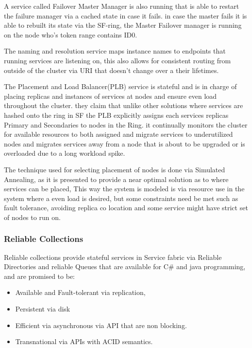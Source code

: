 \documentclass[a4paper,10pt,titlepage]{report}
\begin{document}
A service called Failover Master Manager is also running that is able to restart the failure manager via a cached state in case it fails. in case the master fails it is able to rebuilt its state via the SF-ring, the Master Failover manager is running on the node who's token range contains ID0.\\
\vspace{5mm}

The naming and resolution service maps instance names to endpoints that running services are listening on, this also allows for consistent routing from outside of the cluster via URI that doesn't change over a their lifetimes.\\
\vspace{5mm} 

The Placement and Load Balancer(PLB) service is stateful and is in charge of placing replicas and instances of services at nodes and ensure even load throughout the cluster. they claim that unlike other solutions where services are hashed onto the ring in SF the PLB explicitly assigns each services replicas Primary and Secondaries to nodes in the Ring. it continually monitors the cluster for available resources to both assigned and migrate services to underutilized nodes and migrates services away from a node that is about to be upgraded or is overloaded due to a long workload spike.\\
\vspace{5mm}

The technique used for selecting placement of nodes is done via Simulated Annealing, as it is presented to provide a near optimal solution as to where services can be placed, This way the system is modeled is via resource use in the system where a even load is desired, but some constraints need be met such as fault tolerance, avoiding replica co location and some service might have strict set of nodes to run on. \\
\vspace{5mm}


\subsubsection{Reliable Collections}

Reliable collections provide stateful services in Service fabric via Reliable Directories and reliable Queues that are available for C\# and java programming, and are promised to be:
\begin{itemize}
    \item Available and Fault-tolerant via replication,
    \item Persistent via disk
    \item Efficient via asynchronous via API that are non blocking. 
    \item Transnational via APIs with ACID semantics.
\end{itemize}
\end{document}
